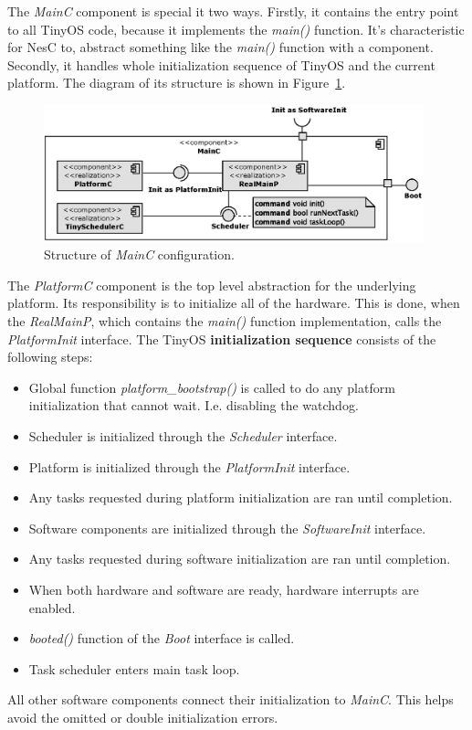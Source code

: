 The \emph{MainC} component is special it two ways. Firstly, it
contains the entry point to all TinyOS code, because it implements the
\emph{main()} function. It's characteristic for NesC to, abstract
something like the \emph{main()} function with a component. Secondly,
it handles whole initialization sequence of TinyOS and the current
platform. The diagram of its structure is shown in
Figure~\ref{fig:mainc}.
\begin{figure}[h]
  \centering
  \includegraphics[width=0.98\textwidth]{diagrams/mainc.eps}
  \caption{Structure of \emph{MainC} configuration.}
  \label{fig:mainc}
\end{figure}
The \emph{PlatformC} component is the top level abstraction for the
underlying platform. Its responsibility is to initialize all of the
hardware. This is done, when the \emph{RealMainP}, which contains the
\emph{main()} function implementation, calls the \emph{PlatformInit}
interface. The TinyOS {\bf initialization sequence} consists of the
following steps:
\begin{itemize}
  \item Global function \emph{platform\_bootstrap()} is called to do
    any platform initialization that cannot wait. I.e. disabling the
    watchdog.
  \item Scheduler is initialized through the \emph{Scheduler} interface.
  \item Platform is initialized through the \emph{PlatformInit} interface.
  \item Any tasks requested during platform initialization are ran
    until completion.
  \item Software components are initialized through the
    \emph{SoftwareInit} interface.
  \item Any tasks requested during software initialization are ran
    until completion.
  \item When both hardware and software are ready, hardware interrupts
    are enabled.
  \item \emph{booted()} function of the \emph{Boot} interface is
    called.
  \item Task scheduler enters main task loop.
\end{itemize}
All other software components connect their initialization to
\emph{MainC}. This helps avoid the omitted or double initialization
errors.

